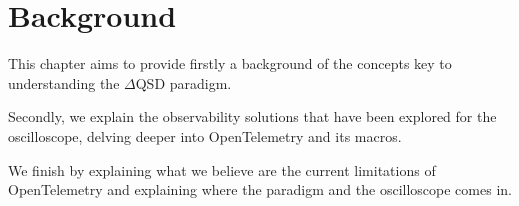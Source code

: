 \chapter{Background}
    This chapter aims to provide firstly a background of the concepts key to understanding the $\Delta$QSD paradigm.

    Secondly, we explain the observability solutions that have been explored for the oscilloscope, delving deeper into OpenTelemetry and its macros.
    
    We finish by explaining what we believe are the current limitations of OpenTelemetry and explaining where the paradigm and the oscilloscope comes in.
    
    
    
    

